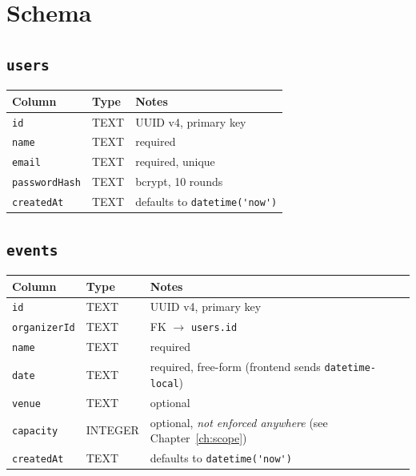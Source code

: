﻿\documentclass[11pt,letterpaper]{report}
\newcommand{\code}[1]{\lstinline[breaklines=true]{#1}}
\begin{document}
\section{Schema}

\subsection{\code{users}}
\begin{center}
\begin{tabular}{p{3cm}p{2cm}p{8cm}}
\toprule
\textbf{Column} & \textbf{Type} & \textbf{Notes} \\
\midrule
\code{id} & TEXT & UUID v4, primary key \\
\code{name} & TEXT & required \\
\code{email} & TEXT & required, unique \\
\code{passwordHash} & TEXT & bcrypt, 10 rounds \\
\code{createdAt} & TEXT & defaults to \code{datetime('now')} \\
\bottomrule
\end{tabular}
\end{center}

\subsection{\code{events}}
\begin{center}
\begin{tabular}{p{3cm}p{2cm}p{8cm}}
\toprule
\textbf{Column} & \textbf{Type} & \textbf{Notes} \\
\midrule
\code{id} & TEXT & UUID v4, primary key \\
\code{organizerId} & TEXT & FK $\rightarrow$ \code{users.id} \\
\code{name} & TEXT & required \\
\code{date} & TEXT & required, free-form (frontend sends \code{datetime-local}) \\
\code{venue} & TEXT & optional \\
\code{capacity} & INTEGER & optional, \emph{not enforced anywhere} (see Chapter~\ref{ch:scope}) \\
\code{createdAt} & TEXT & defaults to \code{datetime('now')} \\
\bottomrule
\end{tabular}
\end{center}
\end{document}
